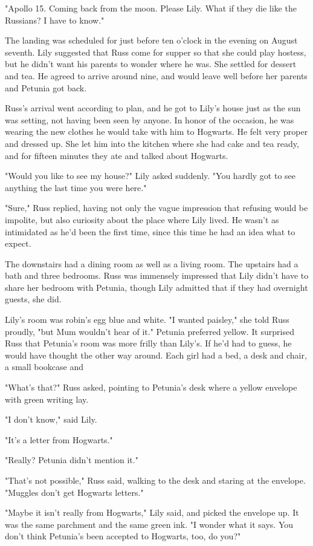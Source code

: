 "Apollo 15. Coming back from the moon. Please Lily. What if they die like the Russians? I have to know."

The landing was scheduled for just before ten o'clock in the evening on August seventh. Lily suggested that Russ come for supper so that she could play hostess, but he didn't want his parents to wonder where he was. She settled for dessert and tea. He agreed to arrive around nine, and would leave well before her parents and Petunia got back.

Russ's arrival went according to plan, and he got to Lily's house just as the sun was setting, not having been seen by anyone. In honor of the occasion, he was wearing the new clothes he would take with him to Hogwarts. He felt very proper and dressed up. She let him into the kitchen where she had cake and tea ready, and for fifteen minutes they ate and talked about Hogwarts.

"Would you like to see my house?" Lily asked suddenly. "You hardly got to see anything the last time you were here."

"Sure," Russ replied, having not only the vague impression that refusing would be impolite, but also curiosity about the place where Lily lived. He wasn't as intimidated as he'd been the first time, since this time he had an idea what to expect.

The downstairs had a dining room as well as a living room. The upstairs had a bath and three bedrooms. Russ was immensely impressed that Lily didn't have to share her bedroom with Petunia, though Lily admitted that if they had overnight guests, she did.

Lily's room was robin's egg blue and white. "I wanted paisley," she told Russ proudly, "but Mum wouldn't hear of it." Petunia preferred yellow. It surprised Russ that Petunia's room was more frilly than Lily's. If he'd had to guess, he would have thought the other way around. Each girl had a bed, a desk and chair, a small bookcase and{\el}

"What's that?" Russ asked, pointing to Petunia's desk where a yellow envelope with green writing lay.

"I don't know," said Lily.

"It's a letter from Hogwarts."

"Really? Petunia didn't mention it."

"That's not possible," Russ said, walking to the desk and staring at the envelope. "Muggles don't get Hogwarts letters."

"Maybe it isn't really from Hogwarts," Lily said, and picked the envelope up. It was the same parchment and the same green ink. "I wonder what it says. You don't think Petunia's been accepted to Hogwarts, too, do you?"

